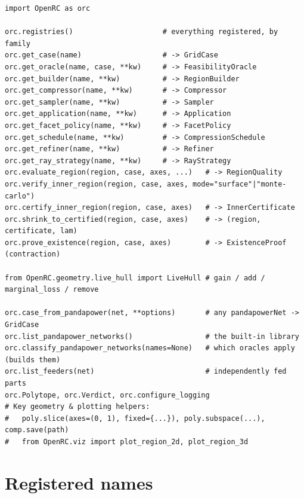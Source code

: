 \documentclass[11pt,a4paper]{report}
\begin{document}
\begin{lstlisting}
import OpenRC as orc

orc.registries()                     # everything registered, by family
orc.get_case(name)                   # -> GridCase
orc.get_oracle(name, case, **kw)     # -> FeasibilityOracle
orc.get_builder(name, **kw)          # -> RegionBuilder
orc.get_compressor(name, **kw)       # -> Compressor
orc.get_sampler(name, **kw)          # -> Sampler
orc.get_application(name, **kw)      # -> Application
orc.get_facet_policy(name, **kw)     # -> FacetPolicy
orc.get_schedule(name, **kw)         # -> CompressionSchedule
orc.get_refiner(name, **kw)          # -> Refiner
orc.get_ray_strategy(name, **kw)     # -> RayStrategy
orc.evaluate_region(region, case, axes, ...)   # -> RegionQuality
orc.verify_inner_region(region, case, axes, mode="surface"|"monte-carlo")
orc.certify_inner_region(region, case, axes)   # -> InnerCertificate
orc.shrink_to_certified(region, case, axes)    # -> (region, certificate, lam)
orc.prove_existence(region, case, axes)        # -> ExistenceProof (contraction)

from OpenRC.geometry.live_hull import LiveHull # gain / add / marginal_loss / remove

orc.case_from_pandapower(net, **options)       # any pandapowerNet -> GridCase
orc.list_pandapower_networks()                 # the built-in library
orc.classify_pandapower_networks(names=None)   # which oracles apply (builds them)
orc.list_feeders(net)                          # independently fed parts
orc.Polytope, orc.Verdict, orc.configure_logging
# Key geometry & plotting helpers:
#   poly.slice(axes=(0, 1), fixed={...}), poly.subspace(...), comp.save(path)
#   from OpenRC.viz import plot_region_2d, plot_region_3d
\end{lstlisting}

\section{Registered names}
\end{document}

